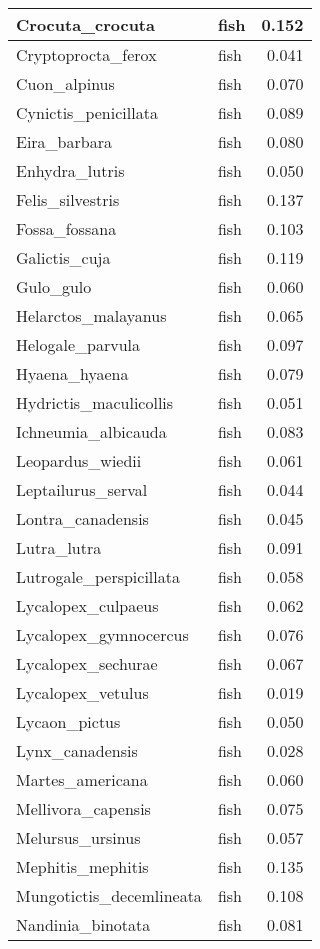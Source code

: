 \begin{table}
\begin{tabular}[t]{l|l|r}
\hline
Crocuta\_crocuta & fish & 0.152\\
\hline
Cryptoprocta\_ferox & fish & 0.041\\
\hline
Cuon\_alpinus & fish & 0.070\\
\hline
Cynictis\_penicillata & fish & 0.089\\
\hline
Eira\_barbara & fish & 0.080\\
\hline
Enhydra\_lutris & fish & 0.050\\
\hline
Felis\_silvestris & fish & 0.137\\
\hline
Fossa\_fossana & fish & 0.103\\
\hline
Galictis\_cuja & fish & 0.119\\
\hline
Gulo\_gulo & fish & 0.060\\
\hline
Helarctos\_malayanus & fish & 0.065\\
\hline
Helogale\_parvula & fish & 0.097\\
\hline
Hyaena\_hyaena & fish & 0.079\\
\hline
Hydrictis\_maculicollis & fish & 0.051\\
\hline
Ichneumia\_albicauda & fish & 0.083\\
\hline
Leopardus\_wiedii & fish & 0.061\\
\hline
Leptailurus\_serval & fish & 0.044\\
\hline
Lontra\_canadensis & fish & 0.045\\
\hline
Lutra\_lutra & fish & 0.091\\
\hline
Lutrogale\_perspicillata & fish & 0.058\\
\hline
Lycalopex\_culpaeus & fish & 0.062\\
\hline
Lycalopex\_gymnocercus & fish & 0.076\\
\hline
Lycalopex\_sechurae & fish & 0.067\\
\hline
Lycalopex\_vetulus & fish & 0.019\\
\hline
Lycaon\_pictus & fish & 0.050\\
\hline
Lynx\_canadensis & fish & 0.028\\
\hline
Martes\_americana & fish & 0.060\\
\hline
Mellivora\_capensis & fish & 0.075\\
\hline
Melursus\_ursinus & fish & 0.057\\
\hline
Mephitis\_mephitis & fish & 0.135\\
\hline
Mungotictis\_decemlineata & fish & 0.108\\
\hline
Nandinia\_binotata & fish & 0.081\\

\end{tabular}
\end{table}
